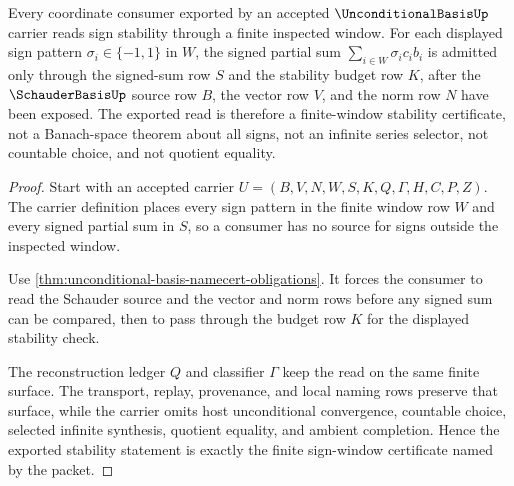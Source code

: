 \begin{theorem}
\label{thm:unconditional-basis-sign-window-stability}
Every coordinate consumer exported by an accepted $\UnconditionalBasisUp$ carrier reads sign stability through a finite inspected window. For each displayed sign pattern $\sigma_i\in\{-1,1\}$ in $W$, the signed partial sum $\sum_{i\in W}\sigma_i c_i b_i$ is admitted only through the signed-sum row $S$ and the stability budget row $K$, after the $\SchauderBasisUp$ source row $B$, the vector row $V$, and the norm row $N$ have been exposed. The exported read is therefore a finite-window stability certificate, not a Banach-space theorem about all signs, not an infinite series selector, not countable choice, and not quotient equality.
\end{theorem}
\begin{proof}
Start with an accepted carrier $U=(B,V,N,W,S,K,Q,\Gamma,H,C,P,Z)$. The carrier definition places every sign pattern in the finite window row $W$ and every signed partial sum in $S$, so a consumer has no source for signs outside the inspected window.

Use \autoref{thm:unconditional-basis-namecert-obligations}. It forces the consumer to read the Schauder source and the vector and norm rows before any signed sum can be compared, then to pass through the budget row $K$ for the displayed stability check.

The reconstruction ledger $Q$ and classifier $\Gamma$ keep the read on the same finite surface. The transport, replay, provenance, and local naming rows preserve that surface, while the carrier omits host unconditional convergence, countable choice, selected infinite synthesis, quotient equality, and ambient completion. Hence the exported stability statement is exactly the finite sign-window certificate named by the packet.
\end{proof}


